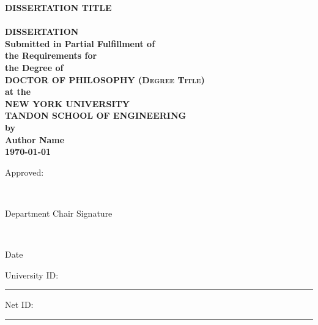 
\begin{titlepage}
\begin{center}
\enlargethispage{24pt}

\sffamily
\bfseries
\Large{DISSERTATION TITLE} \\
\HRule \\

\textsc{
\textrm{
\Large{DISSERTATION}}}\\[0.25cm]
\normalsize{Submitted in Partial Fulfillment of \\
the Requirements for \\
the Degree of} \\[0.5cm]
\textsc{
\textrm{
\Large{DOCTOR OF PHILOSOPHY (Degree Title)}}} \\[0.5cm]
at the \\
\textsc{
\textrm{
\Large{NEW YORK UNIVERSITY \\
\setlength{\parskip}{-.5em}
TANDON SCHOOL OF ENGINEERING}}} \\
by \\[0.5cm]

\textrm{
\Large
Author Name}\\[0.25cm]

\textrm{
{\today}} \\[1cm]

\end{center}

\normalsize{
\hspace{8cm} Approved:}


\hspace{8cm} \hrulefill\

\vspace{-0.5cm}

\hspace{8cm}
\small{Department Chair Signature


\hspace{8cm} \hrulefill\

\vspace{-0.5cm}

\hspace{8cm} Date}

\vspace{0.5cm}

\normalsize{
University ID:}
\hspace{0.25cm}
\rule{5cm}{0.15mm}


Net ID:
\hspace{1.35cm}
\rule{5cm}{0.15mm}


\end{titlepage}
